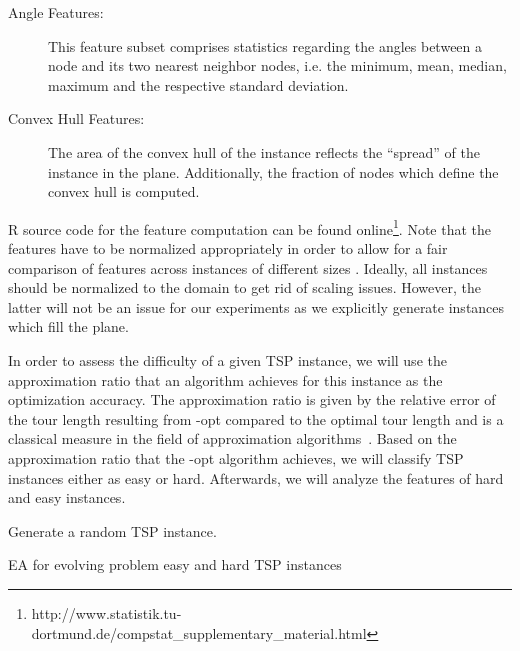 \documentclass{article}
\begin{document}
\begin{description}
\item[Angle Features:] This feature subset comprises statistics
  regarding the angles between a node and its two nearest neighbor
  nodes, i.e. the minimum, mean, median, maximum and the respective
  standard deviation.

\item[Convex Hull Features:] The area of the convex hull of the
  instance reflects the ``spread'' of the instance in the
  plane. Additionally, the fraction of nodes which define the convex
  hull is computed.
\end{description}

R \cite{RR} source code for the feature computation can be found online\footnote{\label{fn:code} http://www.statistik.tu-dortmund.de/compstat\_supplementary\_material.html}. Note that the features have to be
normalized appropriately in order to allow for a fair comparison of
features across instances of different sizes . Ideally, all
instances should be normalized to the domain  to get rid of
scaling issues. However, the latter will not be an issue for our
experiments as we explicitly generate instances which fill the
 plane.

In order to assess the difficulty of a given TSP instance, we will use
the approximation ratio that an algorithm achieves for this instance
as the optimization accuracy. The approximation ratio is given by the
relative error of the tour length resulting from -opt compared to
the optimal tour length and is a classical measure in the field of
approximation algorithms~\cite{Vaz01}. Based on the approximation
ratio that the -opt algorithm achieves, we will classify TSP
instances either as easy or hard. Afterwards, we will analyze the
features of hard and easy instances.

\def\mat#1{\mathbf #1}
\def\abs#1{\left|#1\right|}

\begin{algorithm}
  \caption{Generate a random TSP instance.}
  \label{alg:randomInstance}
  \begin{algorithmic}
    \For{}
    \State 
    \State 
    \EndFor
    \State \Return 
    \EndFunction
  \end{algorithmic}
\end{algorithm}

\begin{algorithm}
  \caption{EA for evolving problem easy and hard TSP instances}
  \label{alg:EA}
  \begin{algorithmic}
    \State 
    \For{}
    \State 
    \State 
    \If{}
    \State 
    \State 
    \EndIf
    \EndFor
    \For{}
    \For{}
    \State 
    \EndFor
    \State 
    \State  {}
    \For{}
    \State 
    \State 
    \State 
    \If{!}
    \State }
    \EndIf
    \State 
    \State }
    \If{rnd}
    \State 
    \State 
    \EndIf
    \EndFor
    \State 
    \If{over time limit }
    \State \Return 
    \EndIf
    \EndFor
    \EndFunction
  \end{algorithmic}
\end{algorithm}
\end{document}
